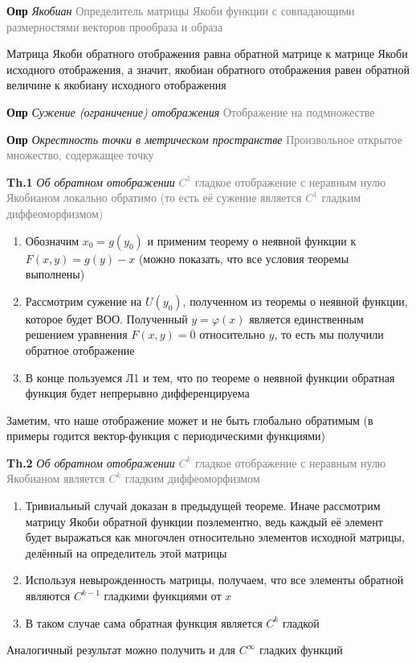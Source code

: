 \textbf{Опр} \textit{Якобиан}
\textcolor{gray}{Определитель матрицы Якоби функции с совпадающими размерностями векторов прообраза и образа}

Матрица Якоби обратного отображения равна обратной матрице к матрице Якоби исходного отображения, а значит, якобиан
обратного отображения равен обратной величине к якобиану исходного отображения

\textbf{Опр} \textit{Сужение (ограничение) отображения} \textcolor{gray}{Отображение на подмножестве}

\textbf{Опр} \textit{Окрестность точки в метрическом пространстве} \textcolor{gray}{Произвольное открытое множество,
    содержащее точку}

\textbf{Th.1} \textit{Об обратном отображении} \textcolor{gray}{$C^1$ гладкое отображение с неравным нулю Якобианом
локально обратимо (то есть её сужение является $C^1$ гладким диффеоморфизмом)}

\begin{enumerate}
    \item Обозначим $x_0 = g(y_0)$ и применим теорему о неявной функции к $F (x, y) = g(y) - x$ (можно показать, что
    все условия теоремы выполнены)
    \item Рассмотрим сужение на $U(y_0)$, полученном из теоремы о неявной функции, которое будет ВОО.
    Полученный $y = \varphi (x)$ является единственным решением уравнения $F (x, y) = \overline{0}$ относительно $y$, то есть мы получили обратное отображение
    \item В конце пользуемся Л1 и тем, что по теореме о неявной функции обратная функция будет непрерывно
    дифференцируема
\end{enumerate}

Заметим, что наше отображение может и не быть глобально обратимым (в примеры годится вектор-функция с периодическими
функциями)

\textbf{Th.2} \textit{Об обратном отображении} \textcolor{gray}{$C^k$ гладкое отображение с неравным нулю Якобианом
является $C^k$ гладким диффеоморфизмом}

\begin{enumerate}
    \item Тривиальный случай доказан в предыдущей теореме.
    Иначе рассмотрим матрицу Якоби обратной функции поэлементно, ведь каждый её элемент будет выражаться как многочлен
    относительно элементов исходной матрицы, делённый на определитель этой матрицы
    \item Используя невырожденность матрицы, получаем, что все элементы обратной являются $C^{k-1}$ гладкими
    функциями от $x$
    \item В таком случае сама обратная функция является $C^k$ гладкой
\end{enumerate}
Аналогичный результат можно получить и для $C^{\infty}$ гладких функций

